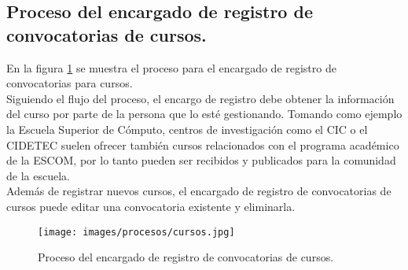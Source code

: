 \subsection{Proceso del encargado de registro de convocatorias de cursos.}

En la figura \ref{fig:cursos} se muestra el proceso para el encargado de registro de convocatorias para cursos. \\

Siguiendo el flujo del proceso, el encargo de registro debe obtener la información del curso por parte de la persona que lo esté gestionando. Tomando como ejemplo la Escuela Superior de Cómputo, centros de investigación como el CIC o el CIDETEC suelen ofrecer también cursos relacionados con el programa académico de la ESCOM, por lo tanto pueden ser recibidos y publicados para la comunidad de la escuela. \\

Además de registrar nuevos cursos, el encargado de registro de convocatorias de cursos puede editar una convocatoria existente y eliminarla.

\begin{figure}[h!]
	\begin{center}
		\texttt{[image: images/procesos/cursos.jpg]}
		\caption{Proceso del encargado de registro de convocatorias de cursos.}
		\label{fig:cursos}
	\end{center}
\end{figure}